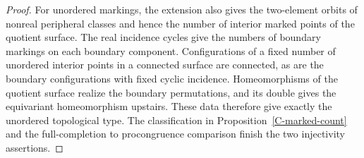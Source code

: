 \documentclass[11pt,oneside]{article}
\begin{document}
\begin{proof}
For unordered markings, the extension also gives the two-element
orbits of nonreal peripheral classes and hence the number of
interior marked points of the quotient surface. The real incidence
cycles give the numbers of boundary markings on each boundary
component. Configurations of a fixed number of unordered interior
points in a connected surface are connected, as are the boundary
configurations with fixed cyclic incidence. Homeomorphisms of the
quotient surface realize the boundary permutations, and its double
gives the equivariant homeomorphism upstairs. These data therefore
give exactly the unordered topological type. The classification
in Proposition~\ref{C-marked-count} and the full-completion to
procongruence comparison finish the two injectivity assertions.
\end{proof}
\end{document}
